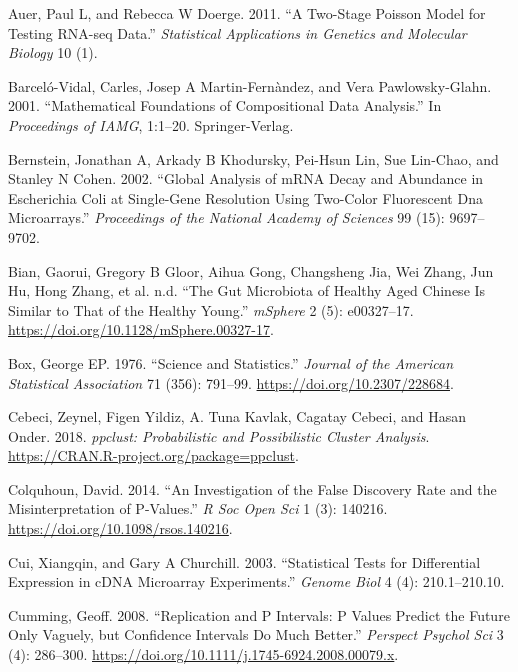 \documentclass[onecolumn]{article}
\begin{document}
\leavevmode\hypertarget{ref-auer:2011}{}%
Auer, Paul L, and Rebecca W Doerge. 2011. ``A Two-Stage Poisson Model for Testing RNA-seq Data.'' \emph{Statistical Applications in Genetics and Molecular Biology} 10 (1).

\leavevmode\hypertarget{ref-barcelo:2001}{}%
Barceló-Vidal, Carles, Josep A Martin-Fernàndez, and Vera Pawlowsky-Glahn. 2001. ``Mathematical Foundations of Compositional Data Analysis.'' In \emph{Proceedings of IAMG}, 1:1--20. Springer-Verlag.

\leavevmode\hypertarget{ref-mRNA:2002}{}%
Bernstein, Jonathan A, Arkady B Khodursky, Pei-Hsun Lin, Sue Lin-Chao, and Stanley N Cohen. 2002. ``Global Analysis of mRNA Decay and Abundance in Escherichia Coli at Single-Gene Resolution Using Two-Color Fluorescent Dna Microarrays.'' \emph{Proceedings of the National Academy of Sciences} 99 (15): 9697--9702.

\leavevmode\hypertarget{ref-bian:2017}{}%
Bian, Gaorui, Gregory B Gloor, Aihua Gong, Changsheng Jia, Wei Zhang, Jun Hu, Hong Zhang, et al. n.d. ``The Gut Microbiota of Healthy Aged Chinese Is Similar to That of the Healthy Young.'' \emph{mSphere} 2 (5): e00327--17. \url{https://doi.org/10.1128/mSphere.00327-17}.

\leavevmode\hypertarget{ref-box:1976}{}%
Box, George EP. 1976. ``Science and Statistics.'' \emph{Journal of the American Statistical Association} 71 (356): 791--99. \url{https://doi.org/10.2307/228684}.

\leavevmode\hypertarget{ref-fuzzy:2018}{}%
Cebeci, Zeynel, Figen Yildiz, A. Tuna Kavlak, Cagatay Cebeci, and Hasan Onder. 2018. \emph{ppclust: Probabilistic and Possibilistic Cluster Analysis}. \url{https://CRAN.R-project.org/package=ppclust}.

\leavevmode\hypertarget{ref-Colquhoun:2014aa}{}%
Colquhoun, David. 2014. ``An Investigation of the False Discovery Rate and the Misinterpretation of P-Values.'' \emph{R Soc Open Sci} 1 (3): 140216. \url{https://doi.org/10.1098/rsos.140216}.

\leavevmode\hypertarget{ref-Cui:2003aa}{}%
Cui, Xiangqin, and Gary A Churchill. 2003. ``Statistical Tests for Differential Expression in cDNA Microarray Experiments.'' \emph{Genome Biol} 4 (4): 210.1--210.10.

\leavevmode\hypertarget{ref-Cumming:2008aa}{}%
Cumming, Geoff. 2008. ``Replication and P Intervals: P Values Predict the Future Only Vaguely, but Confidence Intervals Do Much Better.'' \emph{Perspect Psychol Sci} 3 (4): 286--300. \url{https://doi.org/10.1111/j.1745-6924.2008.00079.x}.
\end{document}
